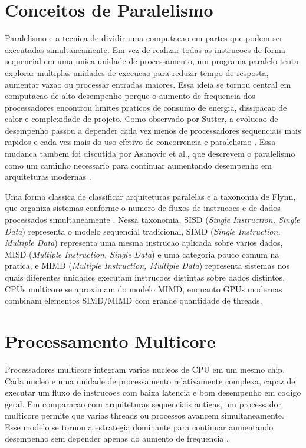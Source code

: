 \section{Conceitos de Paralelismo}
Paralelismo e a tecnica de dividir uma computacao em partes que podem ser
executadas simultaneamente. Em vez de realizar todas as instrucoes de forma
sequencial em uma unica unidade de processamento, um programa paralelo tenta
explorar multiplas unidades de execucao para reduzir tempo de resposta, aumentar
vazao ou processar entradas maiores. Essa ideia se tornou central em computacao
de alto desempenho porque o aumento de frequencia dos processadores encontrou
limites praticos de consumo de energia, dissipacao de calor e complexidade de
projeto. Como observado por Sutter, a evolucao de desempenho passou a depender
cada vez menos de processadores sequenciais mais rapidos e cada vez mais do uso
efetivo de concorrencia e paralelismo \cite{sutterfree}. Essa mudanca tambem foi
discutida por Asanovic et al., que descrevem o paralelismo como um caminho
necessario para continuar aumentando desempenho em arquiteturas modernas
\cite{asanoviclandscape}.

Uma forma classica de classificar arquiteturas paralelas e a taxonomia de Flynn,
que organiza sistemas conforme o numero de fluxos de instrucoes e de dados
processados simultaneamente \cite{flynntaxonomy}. Nessa taxonomia, SISD
(\textit{Single Instruction, Single Data}) representa o modelo sequencial
tradicional, SIMD (\textit{Single Instruction, Multiple Data}) representa uma
mesma instrucao aplicada sobre varios dados, MISD (\textit{Multiple Instruction,
Single Data}) e uma categoria pouco comum na pratica, e MIMD (\textit{Multiple
Instruction, Multiple Data}) representa sistemas nos quais diferentes unidades
executam instrucoes distintas sobre dados distintos. CPUs multicore se aproximam
do modelo MIMD, enquanto GPUs modernas combinam elementos SIMD/MIMD com grande
quantidade de threads.

\section{Processamento Multicore}

Processadores multicore integram varios nucleos de CPU em um mesmo chip. Cada
nucleo e uma unidade de processamento relativamente complexa, capaz de executar
um fluxo de instrucoes com baixa latencia e bom desempenho em codigo geral. Em
comparacao com arquiteturas sequenciais antigas, um processador multicore permite
que varias threads ou processos avancem simultaneamente. Esse modelo se tornou a
estrategia dominante para continuar aumentando desempenho sem depender apenas do
aumento de frequencia \cite{hennessypatterson}.

